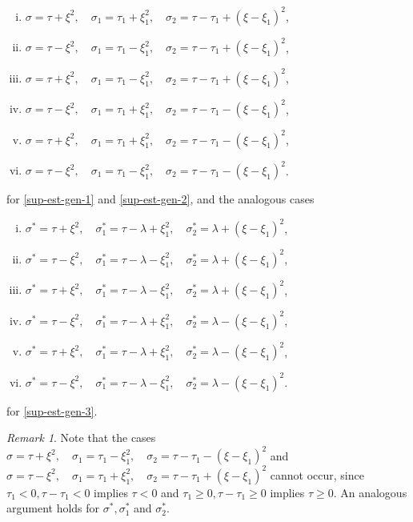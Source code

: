 \documentclass[12pt,reqno]{amsart}
\numberwithin{equation}{section}  %
\numberwithin{figure}{section}
\theoremstyle{plain}
\theoremstyle{definition}
\theoremstyle{remark}
\newtheorem{remark}{Remark}
\begin{document}
\begin{enumerate}[(i)]
    \item $ \sigma=\tau+\xi^2,\quad \sigma_1=\tau_1+\xi_1^2,\quad \sigma_2=\tau -
      \tau_1+(\xi - \xi_1)^2$,
\label{it-real-1}
    \item $ \sigma=\tau-\xi^2,\quad \sigma_1=\tau_1-\xi_1^2,\quad \sigma_2=\tau - \tau_1+(\xi - \xi_1)^2$,
\label{it-real-2}
    \item  $\sigma=\tau+\xi^2,\quad \sigma_1=\tau_1-\xi_1^2,\quad \sigma_2=\tau - \tau_1+(\xi - \xi_1)^2$,
      \label{it-real-3}
    \item $\sigma=\tau-\xi^2,\quad \sigma_1=\tau_1+\xi_1^2,\quad \sigma_2=\tau - \tau_1-(\xi - \xi_1)^2$,
\label{it-real-4}
    \item $\sigma=\tau+\xi^2,\quad \sigma_1=\tau_1+\xi_1^2,\quad \sigma_2=\tau - \tau_1-(\xi - \xi_1)^2$,
\label{it-real-5}
    \item $\sigma=\tau-\xi^2,\quad \sigma_1=\tau_1-\xi_1^2,\quad \sigma_2=\tau - \tau_1-(\xi - \xi_1)^2$.
\label{it-real-6}
\end{enumerate}
%
for \eqref{sup-est-gen-1} and \eqref{sup-est-gen-2}, and the analogous cases
%
\begin{enumerate}[(i)]
\item $ \sigma^{*}=\tau+\xi^2,\quad \sigma^{*}_1=\tau - \lambda+\xi_1^2,\quad
  \sigma^{*}_2=\lambda+(\xi - \xi_1)^2$, \label{it-1-star-real} \item $
  \sigma^{*}=\tau-\xi^2,\quad \sigma^{*}_1=\tau - \lambda-\xi_{1}^2,\quad
  \sigma^{*}_2=\lambda+(\xi - \xi_1)^2$, \label{it-2-star-real} \item
  $\sigma^{*}=\tau+\xi^2,\quad \sigma^{*}_1=\tau - \lambda-\xi_1^2,\quad
  \sigma^{*}_2=\lambda+(\xi - \xi_1)^2$, \label{it-3-star-real} \item
  $\sigma^{*}=\tau-\xi^2,\quad \sigma^{*}_1=\tau - \lambda+\xi_1^2,\quad
  \sigma^{*}_2=\lambda-(\xi - \xi_1)^2$, \label{it-4-star-real} \item
  $\sigma^{*}=\tau+\xi^2,\quad \sigma^{*}_1=\tau - \lambda+\xi_1^2,\quad
  \sigma^{*}_2=\lambda-(\xi - \xi_1)^2$, \label{it-5-star-real} \item
  $\sigma^{*}=\tau-\xi^2,\quad \sigma^{*}_1=\tau - \lambda-\xi_1^2,\quad
  \sigma^{*}_2= \lambda-(\xi - \xi_1)^2$.  \label{it-6-star-real}
  \end{enumerate}
for \eqref{sup-est-gen-3}.
%
%
\begin{framed}
\begin{remark}
Note that the cases $\sigma=\tau+\xi^2,\quad \sigma_1=\tau_1-\xi_1^2,\quad
\sigma_2=\tau - \tau_1-(\xi - \xi_1)^2$ and $\sigma=\tau-\xi^2,\quad
\sigma_1=\tau_1+\xi_1^2,\quad \sigma_2=\tau - \tau_1+(\xi - \xi_1)^2$ cannot occur, since
$\tau_1< 0, \tau-\tau_1< 0$ implies $\tau<0$ and $\tau_1\geq 0, \tau-\tau_1\geq
0$ implies $\tau\geq 0$. An analogous argument holds for $\sigma^{*},
\sigma_{1}^{*}$ and $\sigma_{2}^{*}$.
\end{remark}
\end{framed}
\end{document}

